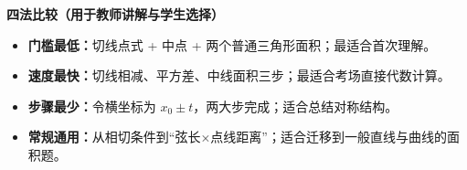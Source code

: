 \begin{proofbox}
    \medskip
    \textbf{\textcolor{CProof}{四法比较（用于教师讲解与学生选择）}}
    \begin{itemize}[leftmargin=*, itemsep=0.4em, topsep=0.35em]
        \item \textbf{门槛最低：}切线点式 + 中点 + 两个普通三角形面积；最适合首次理解。
        \item \textbf{速度最快：}切线相减、平方差、中线面积三步；最适合考场直接代数计算。
        \item \textbf{步骤最少：}令横坐标为 $x_0\pm t$，两大步完成；适合总结对称结构。
        \item \textbf{常规通用：}从相切条件到“弦长$\times$点线距离”；适合迁移到一般直线与曲线的面积题。
    \end{itemize}
\end{proofbox}
